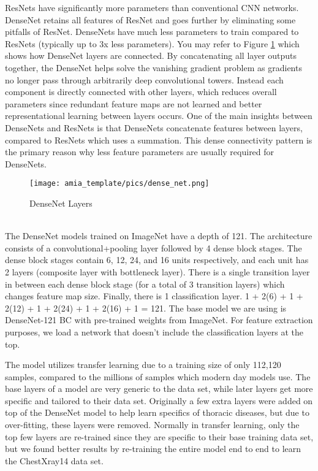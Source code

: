\documentclass{amia}
\begin{document}
ResNets have significantly more parameters than conventional CNN networks. DenseNet retains all features of ResNet and goes further by eliminating some pitfalls of ResNet. DenseNets have much less parameters to train compared to ResNets (typically up to 3x less parameters). You may refer to Figure \ref{figx} which shows how DenseNet layers are connected. By concatenating all layer outputs together, the DenseNet helps solve the vanishing gradient problem as gradients no longer pass through arbitrarily deep convolutional towers. Instead each component is directly connected with other layers, which reduces overall parameters since redundant feature maps are not learned and better representational learning between layers occurs. One of the main insights between DenseNets and ResNets is that DenseNets concatenate features between layers, compared to ResNets which uses a summation. This dense connectivity pattern is the primary reason why less feature parameters are usually required for DenseNets.
\\
\begin{figure}[!htb]
\centering
\texttt{[image: amia\_template/pics/dense\_net.png]}
\caption{DenseNet Layers}
\label{figx}
\end{figure}
\\
The DenseNet models trained on ImageNet have a depth of 121. The architecture consists of a convolutional+pooling layer followed by 4 dense block stages. The dense block stages contain 6, 12, 24, and 16 units respectively, and each unit has 2 layers (composite layer with bottleneck layer). There is a single transition layer in between each dense block stage (for a total of 3 transition layers) which changes feature map size. Finally, there is 1 classification layer. 1 + 2(6) + 1 + 2(12) + 1 + 2(24) + 1 + 2(16) + 1 = 121. The base model we are using is DenseNet-121 BC with pre-trained weights from ImageNet. For feature extraction purposes, we load a network that doesn't include the classification layers at the top.

The model utilizes transfer learning due to a training size of only 112,120 samples, compared to the millions of samples which modern day models use. The base layers of a model are very generic to the data set, while later layers get more specific and tailored to their data set. Originally a few extra layers were added on top of the DenseNet model to help learn specifics of thoracic diseases, but due to over-fitting, these layers were removed. Normally in transfer learning, only the top few layers are re-trained since they are specific to their base training data set, but we found better results by re-training the entire model end to end to learn the ChestXray14 data set.
\end{document}
